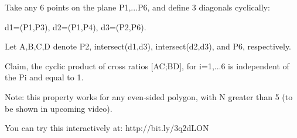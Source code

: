 Take any 6 points on the plane P1,...P6, and define 3 diagonals cyclically:

d1=(P1,P3), d2=(P1,P4), d3=(P2,P6).

Let A,B,C,D denote P2, intersect(d1,d3), intersect(d2,d3), and P6, respectively.

Claim, the cyclic product of cross ratios [AC;BD], for i=1,...6 is independent of the Pi and equal to 1.

Note: this property works for any even-sided polygon, with N greater than 5 (to be shown in upcoming video).

You can try this interactively at: http://bit.ly/3q2dLON